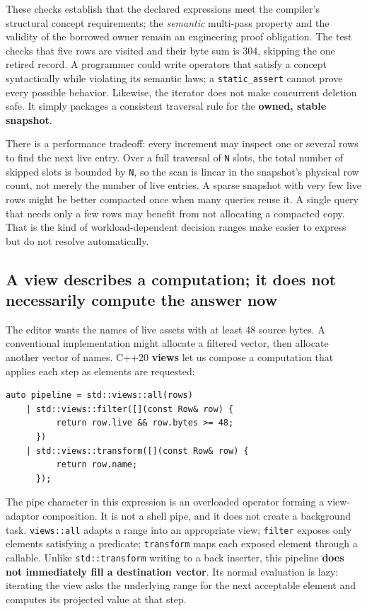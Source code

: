 These checks establish that the declared expressions meet the compiler's structural concept requirements; the \emph{semantic} multi-pass property and the validity of the borrowed owner remain an engineering proof obligation. The test checks that five rows are visited and their byte sum is 304, skipping the one retired record. A programmer could write operators that satisfy a concept syntactically while violating its semantic laws; a \texttt{static\_assert} cannot prove every possible behavior. Likewise, the iterator does not make concurrent deletion safe. It simply packages a consistent traversal rule for the \textbf{owned, stable snapshot}.

There is a performance tradeoff: every increment may inspect one or several rows to find the next live entry. Over a full traversal of \texttt{N} slots, the total number of skipped slots is bounded by \texttt{N}, so the scan is linear in the snapshot's physical row count, not merely the number of live entries. A sparse snapshot with very few live rows might be better compacted once when many queries reuse it. A single query that needs only a few rows may benefit from not allocating a compacted copy. That is the kind of workload-dependent decision ranges make easier to express but do not resolve automatically.

\subsection{A view describes a computation; it does not necessarily compute the answer now}\label{01-foundations-i-ch006-a-view-describes-a-computation-it-does-not-necessarily-compute-the-answer-now}

The editor wants the names of live assets with at least 48 source bytes. A conventional implementation might allocate a filtered vector, then allocate another vector of names. C++20 \textbf{views} let us compose a computation that applies each step as elements are requested:

\begin{verbatim}
auto pipeline = std::views::all(rows)
    | std::views::filter([](const Row& row) {
          return row.live && row.bytes >= 48;
      })
    | std::views::transform([](const Row& row) {
          return row.name;
      });
\end{verbatim}

The pipe character in this expression is an overloaded operator forming a view-adaptor composition. It is not a shell pipe, and it does not create a background task. \texttt{views::all} adapts a range into an appropriate view; \texttt{filter} exposes only elements satisfying a predicate; \texttt{transform} maps each exposed element through a callable. Unlike \texttt{std::transform} writing to a back inserter, this pipeline \textbf{does not immediately fill a destination vector}. Its normal evaluation is lazy: iterating the view asks the underlying range for the next acceptable element and computes its projected value at that step.

